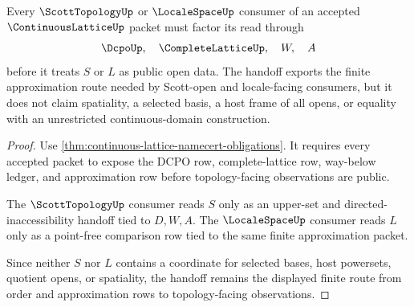 \begin{theorem}
\label{thm:continuous-lattice-scott-handoff}
Every $\ScottTopologyUp$ or $\LocaleSpaceUp$ consumer of an accepted $\ContinuousLatticeUp$ packet must factor its read through
$$
\DcpoUp,\quad \CompleteLatticeUp,\quad W,\quad A
$$
before it treats $S$ or $L$ as public open data. The handoff exports the finite approximation route needed by Scott-open and locale-facing consumers, but it does not claim spatiality, a selected basis, a host frame of all opens, or equality with an unrestricted continuous-domain construction.
\end{theorem}
\begin{proof}
Use \autoref{thm:continuous-lattice-namecert-obligations}. It requires every accepted packet to expose the DCPO row, complete-lattice row, way-below ledger, and approximation row before topology-facing observations are public.

The $\ScottTopologyUp$ consumer reads $S$ only as an upper-set and directed-inaccessibility handoff tied to $D,W,A$. The $\LocaleSpaceUp$ consumer reads $L$ only as a point-free comparison row tied to the same finite approximation packet.

Since neither $S$ nor $L$ contains a coordinate for selected bases, host powersets, quotient opens, or spatiality, the handoff remains the displayed finite route from order and approximation rows to topology-facing observations.
\end{proof}




